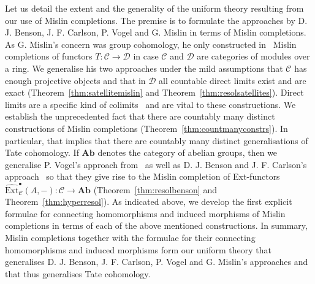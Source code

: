 \documentclass[12pt,a4paper]{article}
\numberwithin{equation}{section}
\theoremstyle{nonumberplain}
\begin{document}
Let us detail the extent and the generality of the uniform theory resulting from our use of Mislin completions. The premise is to formulate the approaches by D.\! J.\! Benson, J.\! F.\! Carlson, P.\! Vogel and G.\! Mislin in terms of Mislin completions. As G.\! Mislin's concern was group cohomology, he only constructed in~\cite{mis94} Mislin completions of functors $T: \mathcal{C} \rightarrow \mathcal{D}$ in case $\mathcal{C}$ and $\mathcal{D}$ are categories of modules over a ring. We generalise his two approaches under the mild assumptions that $\mathcal{C}$ has enough projective objects and that in $\mathcal{D}$ all countable direct limits exist and are exact (Theorem~\ref{thm:satellitemislin} and Theorem~\ref{thm:resolsatellites}). Direct limits are a specific kind of colimits~\cite[p.~14]{rib10} and are vital to these constructions. We establish the unprecedented fact that there are countably many distinct constructions of Mislin completions (Theorem~\ref{thm:countmanyconstrs}). In particular, that implies that there are countably many distinct generalisations of Tate cohomology. If $\mathbf{Ab}$ denotes the category of abelian groups, then we generalise P. Vogel’s approach from~\cite{goi92} as well as D. J. Benson and J. F. Carlson’s approach~\cite{ben92} so that they give rise to the Mislin completion of Ext-functors $\widehat{\mathrm{Ext}}_{\mathcal{C}}^{\bullet}(A, -): \mathcal{C} \rightarrow \mathbf{Ab}$ (Theorem~\ref{thm:resolbenson} and Theorem~\ref{thm:hyperresol}). As indicated above, we develop the first explicit formulae for connecting homomorphisms and induced morphisms of Mislin completions in terms of each of the above mentioned constructions. In summary, Mislin completions together with the formulae for their connecting homomorphisms and induced morphisms form our uniform theory that generalises D.\! J.\! Benson, J.\! F.\! Carlson, P.\! Vogel and G.\! Mislin's approaches and that thus generalises Tate cohomology. \\
\end{document}
